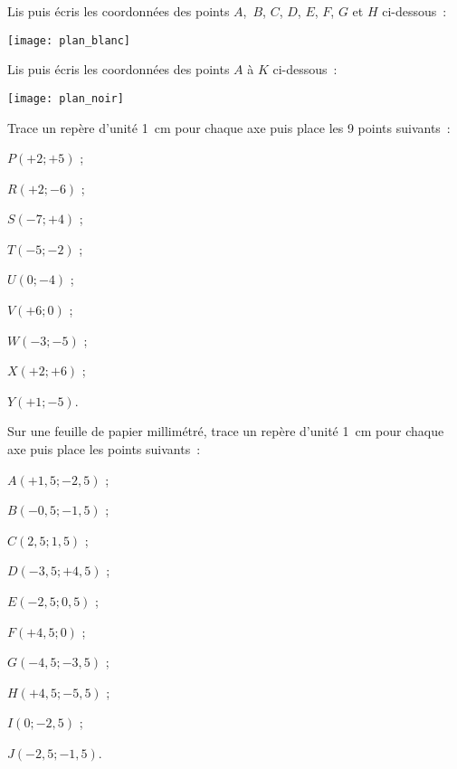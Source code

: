 \begin{exercice}
Lis puis écris les coordonnées des points $A$, $B$, $C$, $D$, $E$, $F$, $G$ et $H$ ci-dessous :
\begin{center} \texttt{[image: plan\_blanc]} \end{center}
\end{exercice}


\begin{exercice}
Lis puis écris les coordonnées des points $A$ à $K$ ci-dessous :
\begin{center} \texttt{[image: plan\_noir]} \end{center}
\end{exercice}


\begin{exercice}
Trace un repère d'unité 1 cm pour chaque axe puis place les 9 points suivants :
\begin{colitemize}{3}
 \item $P(+ 2 ; + 5)$ ;
 \item $R(+ 2 ; - 6)$ ;
 \item $S(- 7 ; + 4)$ ;
 \item $T(- 5 ; - 2)$ ;
 \item $U(0 ; - 4)$ ;
 \item $V(+ 6 ; 0)$ ;
 \item $W(- 3 ; - 5)$ ;
 \item $X(+ 2 ; + 6)$ ;
 \item $Y(+ 1 ; - 5)$.
 \end{colitemize}
\end{exercice}


\begin{exercice}
Sur une feuille de papier millimétré, trace un repère d'unité 1 cm pour chaque axe puis place les points suivants :
\begin{colitemize}{2}
 \item $A(+ 1,5 ; - 2,5)$ ;
 \item $B(- 0,5 ; - 1,5)$ ;
 \item $C(2,5 ; 1,5)$ ;
 \item $D(- 3,5 ; + 4,5)$ ;
 \item $E(- 2,5 ; 0,5)$ ;
 \item $F(+ 4,5 ; 0)$ ;
 \item $G(- 4,5 ; - 3,5)$ ;
 \item $H(+ 4,5 ; - 5,5)$ ;
 \item $I(0 ; - 2,5)$ ;
 \item $J(- 2,5 ; - 1,5)$.
 \end{colitemize}
\end{exercice}


